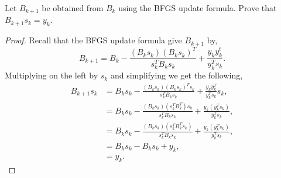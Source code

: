 \documentclass[12pt]{article}
\makeatletter
\theoremstyle{homework}
\newenvironment{exercise}[1]
{\def\@currentlabel{#1}\exercisecore}
{\endexercisecore}
\makeatother
\begin{document}
\begin{exercise}{3.8} Let $B_{k + 1}$ be obtained from $B_k$ using the BFGS update formula. Prove that $B_{k + 1}s_k = y_k$. 
  \begin{proof} Recall that the BFGS update formula give $B_{k + 1}$ by, 
    \begin{equation*}
      B_{k + 1} = B_k - \frac{(B_ks_k)(B_ks_k)^T}{s_k^TB_ks_k} + \frac{y_ky_k^t}{y_k^Ts_k}.
    \end{equation*}
    Multiplying on the left by $s_k$ and simplifying we get the following, 
    \begin{align*}
      B_{k + 1}s_k &=  B_ks_k - \frac{(B_ks_k)(B_ks_k)^Ts_k}{s_k^TB_ks_k} + \frac{y_ky_k^T}{y_k^Ts_k}s_k,\\
     &=  B_ks_k - \frac{(B_ks_k)(s_k^TB_k^T)s_k}{s_k^TB_ks_k} + \frac{y_k(y_k^Ts_k)}{y_k^Ts_k},\\
     &=  B_ks_k - \frac{(B_ks_k)(s_k^TB_k^Ts_k)}{s_k^TB_ks_k} + \frac{y_k(y_k^Ts_k)}{y_k^Ts_k},\\
     &=  B_ks_k - B_ks_k + y_k,\\
     &=  y_k.
    \end{align*}

    \end{proof}
\end{exercise}
\vspace{.5in}
\end{document}
